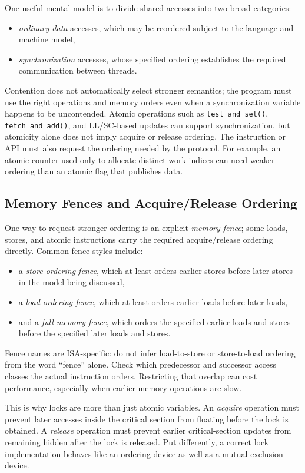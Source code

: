One useful mental model is to divide shared accesses into two broad categories:
\begin{itemize}
    \item \textit{ordinary data} accesses, which may be reordered subject to the language and machine model,
    \item \textit{synchronization} accesses, whose specified ordering establishes the required communication between threads.
\end{itemize}
Contention does not automatically select stronger semantics; the program must use the right operations and memory orders even when a synchronization variable happens to be uncontended.
Atomic operations such as \texttt{test\_and\_set()}, \texttt{fetch\_and\_add()}, and LL/SC-based updates can support synchronization, but atomicity alone does not imply acquire or release ordering.
The instruction or API must also request the ordering needed by the protocol.
For example, an atomic counter used only to allocate distinct work indices can need weaker ordering than an atomic flag that publishes data.

\subsection*{Memory Fences and Acquire/Release Ordering}
One way to request stronger ordering is an explicit \textit{memory fence}; some loads, stores, and atomic instructions carry the required acquire/release ordering directly.
Common fence styles include:
\begin{itemize}
    \item a \textit{store-ordering fence}, which at least orders earlier stores before later stores in the model being discussed,
    \item a \textit{load-ordering fence}, which at least orders earlier loads before later loads,
    \item and a \textit{full memory fence}, which orders the specified earlier loads and stores before the specified later loads and stores.
\end{itemize}
Fence names are ISA-specific: do not infer load-to-store or store-to-load ordering from the word ``fence'' alone.
Check which predecessor and successor access classes the actual instruction orders.
Restricting that overlap can cost performance, especially when earlier memory operations are slow.

This is why locks are more than just atomic variables.
An \textit{acquire} operation must prevent later accesses inside the critical section from floating before the lock is obtained.
A \textit{release} operation must prevent earlier critical-section updates from remaining hidden after the lock is released.
Put differently, a correct lock implementation behaves like an ordering device as well as a mutual-exclusion device.

